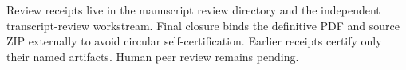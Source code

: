 Review receipts live in the manuscript review directory and the independent transcript-review workstream. Final closure binds the definitive PDF and source ZIP externally to avoid circular self-certification. Earlier receipts certify only their named artifacts. Human peer review remains pending.
